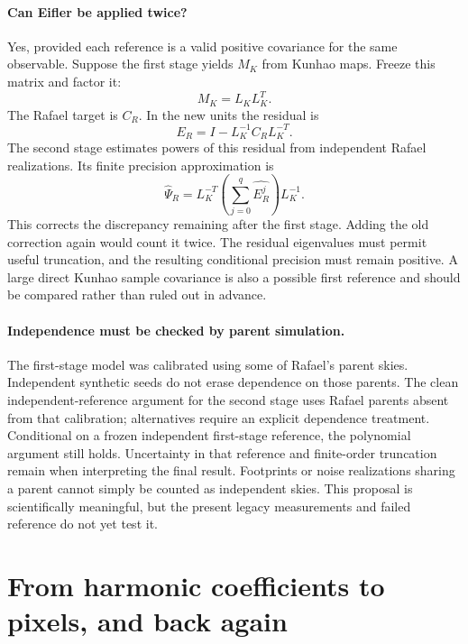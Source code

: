 \documentclass[11pt]{article}
\begin{document}
\paragraph{Can Eifler be applied twice?}
Yes, provided each reference is a valid positive covariance for the same
observable. Suppose the first stage yields $M_K$ from Kunhao maps. Freeze
this matrix and factor it:
\begin{equation}
 M_K=L_K L_K^T.
\end{equation}
The Rafael target is $C_R$. In the new units the residual is
\begin{equation}
 E_R=I-L_K^{-1}C_R L_K^{-T}.
\end{equation}
The second stage estimates powers of this residual from independent
Rafael realizations. Its finite precision approximation is
\begin{equation}
 \widehat\Psi_R=L_K^{-T}
 \left(\sum_{j=0}^q\widehat{E_R^j}\right)L_K^{-1}.
\end{equation}
This corrects the discrepancy remaining after the first stage. Adding the
old correction again would count it twice. The residual eigenvalues must
permit useful truncation, and the resulting conditional precision must
remain positive. A large direct Kunhao sample covariance is also a possible
first reference and should be compared rather than ruled out in advance.

\paragraph{Independence must be checked by parent simulation.}
The first-stage model was calibrated using some of Rafael's parent skies.
Independent synthetic seeds do not erase dependence on those parents.
The clean independent-reference argument for the second stage uses Rafael
parents absent from that calibration; alternatives require an explicit
dependence treatment. Conditional on a frozen independent first-stage
reference, the polynomial argument still holds. Uncertainty in that
reference and finite-order truncation remain when interpreting the final
result. Footprints or noise realizations sharing a parent cannot simply
be counted as independent skies. This proposal is scientifically meaningful,
but the present legacy measurements and failed reference do not yet test it.

\section{From harmonic coefficients to pixels, and back again}
\label{sec:sht-teaching}
\end{document}
